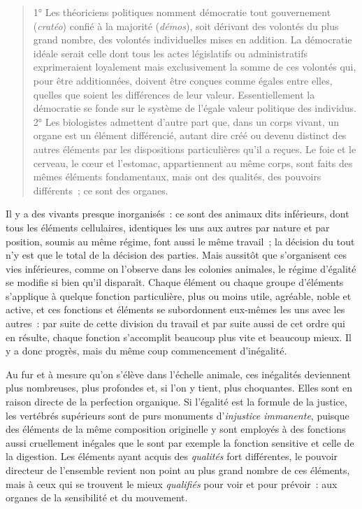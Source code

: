 \documentclass[french,twoside]{book} %
\begin{document}
\begin{verse}
1° Les théoriciens politiques nomment démocratie tout gouvernement (\emph{cratéo}) confié à la majorité (\emph{démos}), soit dérivant des volontés du plus grand nombre, des volontés individuelles mises en addition. La démocratie idéale serait celle dont tous les actes législatifs ou administratifs exprimeraient loyalement mais exclusivement la somme de ces volontés qui, pour être additionnées, doivent être conçues comme égales entre elles, quelles que soient les différences de leur valeur. Essentiellement la démocratie se fonde sur le système de l’égale valeur politique des individus.\\
2° Les biologistes admettent d’autre part que, dans un corps vivant, un organe est un élément différencié, autant dire créé ou devenu distinct des autres éléments par les dispositions particulières qu’il a reçues. Le foie et le cerveau, le cœur et l’estomac, appartiennent au même corps, sont faits des mêmes éléments fondamentaux, mais ont des qualités, des pouvoirs différents ; ce sont des organes.\\
\end{verse}
\noindent Il y a des vivants presque inorganisés : ce sont des animaux dits inférieurs, dont tous les éléments cellulaires, identiques les uns aux autres par nature et par position, soumis au même régime, font aussi le même travail ; la décision du tout n’y est que le total de la décision des parties. Mais aussitôt que s’organisent ces vies inférieures, comme on l’observe dans les colonies animales, le régime d’égalité se modifie si bien qu’il disparaît. Chaque élément ou chaque groupe d’éléments s’applique à quelque fonction particulière, plus ou moins utile, agréable, noble et active, et ces fonctions et éléments se subordonnent eux-mêmes les uns avec les autres : par suite de cette division du travail et par suite aussi de cet ordre qui en résulte, chaque fonction s’accomplit beaucoup plus vite et beaucoup mieux. Il y a donc progrès, mais du même coup commencement d’inégalité.\par
Au fur et à mesure qu’on s’élève dans l’échelle animale, ces inégalités deviennent plus nombreuses, plus profondes et, si l’on y tient, plus choquantes. Elles sont en raison directe de la perfection organique. Si l’égalité est la formule de la justice, les vertébrés supérieurs sont de purs monuments d’\emph{injustice immanente}, puisque des éléments de la même composition originelle y sont employés à des fonctions aussi cruellement inégales que le sont par exemple la fonction sensitive et celle de la digestion. Les éléments ayant acquis des \emph{qualités} fort différentes, le pouvoir directeur de l’ensemble revient non point au plus grand nombre de ces éléments, mais à ceux qui se trouvent le mieux \emph{qualifiés} pour voir et pour prévoir : aux organes de la sensibilité et du mouvement.\par
\end{document}
